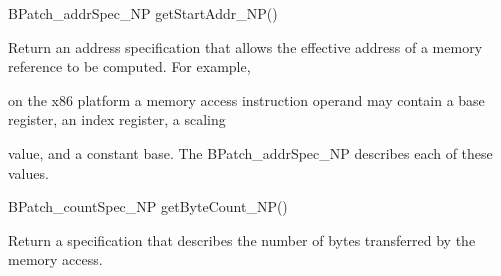 {

BPatch_addrSpec_NP getStartAddr_NP()}



{

Return an address specification that allows the effective address of a memory reference to be computed. For example,

on the x86 platform a memory access instruction operand may contain a base register, an index register, a scaling

value, and a constant base. The BPatch_addrSpec_NP describes each of these values.}



{

BPatch_countSpec_NP getByteCount_NP()}



{

Return a specification that describes the number of bytes transferred by the memory access.}
